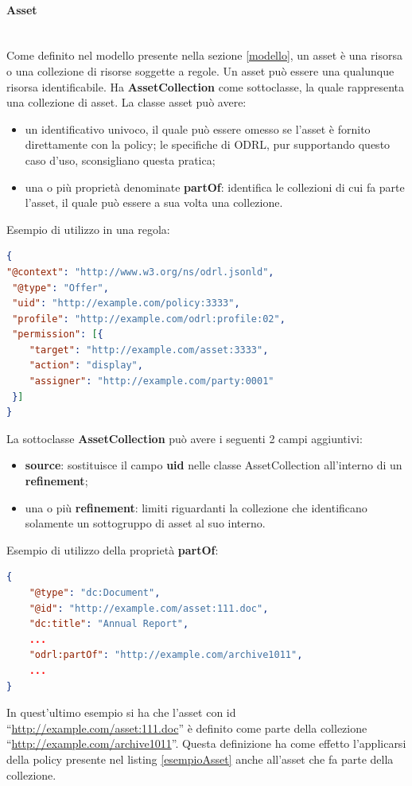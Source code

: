 \documentclass[12pt,a4paper,twoside]{book}
\begin{document}
\paragraph{Asset}\mbox{}\\
Come definito nel modello presente nella sezione \ref{modello}, un asset è una risorsa o una collezione di risorse soggette a regole. Un asset può essere una qualunque risorsa identificabile. Ha \textbf{AssetCollection} come sottoclasse, la quale rappresenta una collezione di asset. La classe asset può avere:
\begin{itemize}
\item un identificativo univoco, il quale può essere omesso se l'asset è fornito direttamente con la policy; le specifiche di ODRL, pur supportando questo caso d'uso, sconsigliano questa pratica;
\item una o più proprietà denominate \textbf{partOf}: identifica le collezioni di cui fa parte l'asset, il quale può essere a sua volta una collezione.
\end{itemize}
Esempio di utilizzo in una regola:
\begin{lstlisting}[language=json,firstnumber=1,caption={Utilizzo di asset nella proprietà \textbf{target} di una regola},captionpos=b,label=esempioAsset]
{
"@context": "http://www.w3.org/ns/odrl.jsonld",
 "@type": "Offer",
 "uid": "http://example.com/policy:3333",
 "profile": "http://example.com/odrl:profile:02",
 "permission": [{
	"target": "http://example.com/asset:3333",
	"action": "display",
	"assigner": "http://example.com/party:0001"
 }]
}
\end{lstlisting}
La sottoclasse \textbf{AssetCollection} può avere i seguenti 2 campi aggiuntivi:
\begin{itemize}
	\item \textbf{source}: sostituisce il campo \textbf{uid} nelle classe AssetCollection all'interno di un \textbf{refinement};
	\item una o più \textbf{refinement}: limiti riguardanti la collezione che identificano solamente un sottogruppo di asset al suo interno.
\end{itemize}
Esempio di utilizzo della proprietà \textbf{partOf}:
\begin{lstlisting}[language=json,firstnumber=1,caption={L'asset definito è parte del target presente nel listing \ref{esempioAsset}},captionpos=b,label=esempioAssetColl]
{
	"@type": "dc:Document",
	"@id": "http://example.com/asset:111.doc",
	"dc:title": "Annual Report",
	...
	"odrl:partOf": "http://example.com/archive1011",
	...
}
\end{lstlisting}
In quest'ultimo esempio si ha che l'asset con id ``\url{http://example.com/asset:111.doc}'' è definito come parte della collezione ``\url{http://example.com/archive1011}''. Questa definizione ha come effetto l'applicarsi della policy presente nel listing \ref{esempioAsset} anche all'asset che fa parte della collezione.
\end{document}
